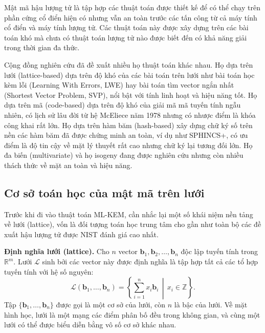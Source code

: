 Mật mã hậu lượng tử là tập hợp các thuật toán được thiết kế để có thể chạy trên phần cứng cổ điển hiện có nhưng vẫn an toàn trước các tấn công từ cả máy tính cổ điển và máy tính lượng tử. Các thuật toán này được xây dựng trên các bài toán khó mà chưa có thuật toán lượng tử nào được biết đến có khả năng giải trong thời gian đa thức.

Cộng đồng nghiên cứu đã đề xuất nhiều họ thuật toán khác nhau. Họ dựa trên lưới (lattice-based) dựa trên độ khó của các bài toán trên lưới như bài toán học kèm lỗi (Learning With Errors, LWE) hay bài toán tìm vector ngắn nhất (Shortest Vector Problem, SVP), nổi bật với tính linh hoạt và hiệu năng tốt. Họ dựa trên mã (code-based) dựa trên độ khó của giải mã mã tuyến tính ngẫu nhiên, có lịch sử lâu đời từ hệ McEliece năm 1978 nhưng có nhược điểm là khóa công khai rất lớn. Họ dựa trên hàm băm (hash-based) xây dựng chữ ký số trên nền các hàm băm đã được chứng minh an toàn, ví dụ như SPHINCS+, có ưu điểm là độ tin cậy về mặt lý thuyết rất cao nhưng chữ ký lại tương đối lớn. Họ đa biến (multivariate) và họ isogeny đang được nghiên cứu nhưng còn nhiều thách thức về mặt an toàn và hiệu năng.

\subsection{Cơ sở toán học của mật mã trên lưới}

Trước khi đi vào thuật toán ML-KEM, cần nhắc lại một số khái niệm nền tảng về lưới (lattice), vốn là đối tượng toán học trung tâm cho gần như toàn bộ các đề xuất hậu lượng tử được NIST đánh giá cao nhất.

\textbf{Định nghĩa lưới (lattice).} Cho $n$ vector $\mathbf{b}_1, \mathbf{b}_2, \ldots, \mathbf{b}_n$ độc lập tuyến tính trong $\mathbb{R}^m$. Lưới $\mathcal{L}$ sinh bởi các vector này được định nghĩa là tập hợp tất cả các tổ hợp tuyến tính với hệ số nguyên:
\[
\mathcal{L}(\mathbf{b}_1, \ldots, \mathbf{b}_n) = \left\{ \sum_{i=1}^{n} x_i \mathbf{b}_i \,\middle|\, x_i \in \mathbb{Z} \right\}.
\]
Tập $\{\mathbf{b}_1, \ldots, \mathbf{b}_n\}$ được gọi là một cơ sở của lưới, còn $n$ là bậc của lưới. Về mặt hình học, lưới là một mạng các điểm phân bố đều trong không gian, và cùng một lưới có thể được biểu diễn bằng vô số cơ sở khác nhau.


